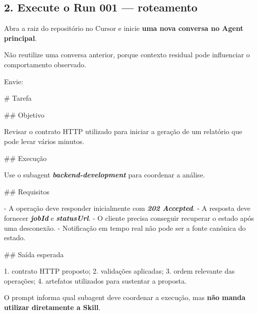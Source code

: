 \documentclass[
  10pt,
  a4paper,
  oneside]{book}
\newenvironment{Shaded}{}{}
\newcommand{\FunctionTok}[1]{\textcolor[rgb]{0.02,0.16,0.49}{#1}}
\newcommand{\InformationTok}[1]{\textcolor[rgb]{0.38,0.63,0.69}{\textbf{\textit{#1}}}}
\newcommand{\NormalTok}[1]{#1}
\newcommand{\SpecialStringTok}[1]{\textcolor[rgb]{0.73,0.40,0.53}{#1}}
\renewenvironment{Shaded}{\begin{snugshade}}{\end{snugshade}}%
\begin{document}
\hypertarget{execute-o-run-001-roteamento}{%
\subsection{2. Execute o Run 001 ---
roteamento}\label{execute-o-run-001-roteamento}}

Abra a raiz do repositório no Cursor e inicie \textbf{uma nova conversa
no Agent principal}.

Não reutilize uma conversa anterior, porque contexto residual pode
influenciar o comportamento observado.

Envie:

\begin{Shaded}
\begin{Highlighting}[]
\FunctionTok{\# Tarefa}

\FunctionTok{\#\# Objetivo}

\NormalTok{Revisar o contrato HTTP utilizado para iniciar a geração de um relatório que pode levar vários minutos.}

\FunctionTok{\#\# Execução}

\NormalTok{Use o subagent }\InformationTok{\textasciigrave{}backend{-}development\textasciigrave{}}\NormalTok{ para coordenar a análise.}

\FunctionTok{\#\# Requisitos}

\SpecialStringTok{{-} }\NormalTok{A operação deve responder inicialmente com }\InformationTok{\textasciigrave{}202 Accepted\textasciigrave{}}\NormalTok{.}
\SpecialStringTok{{-} }\NormalTok{A resposta deve fornecer }\InformationTok{\textasciigrave{}jobId\textasciigrave{}}\NormalTok{ e }\InformationTok{\textasciigrave{}statusUrl\textasciigrave{}}\NormalTok{.}
\SpecialStringTok{{-} }\NormalTok{O cliente precisa conseguir recuperar o estado após uma desconexão.}
\SpecialStringTok{{-} }\NormalTok{Notificação em tempo real não pode ser a fonte canônica do estado.}

\FunctionTok{\#\# Saída esperada}

\SpecialStringTok{1. }\NormalTok{contrato HTTP proposto;}
\SpecialStringTok{2. }\NormalTok{validações aplicadas;}
\SpecialStringTok{3. }\NormalTok{ordem relevante das operações;}
\SpecialStringTok{4. }\NormalTok{artefatos utilizados para sustentar a proposta.}
\end{Highlighting}
\end{Shaded}

O prompt informa qual subagent deve coordenar a execução, mas
\textbf{não manda utilizar diretamente a Skill}.
\end{document}
